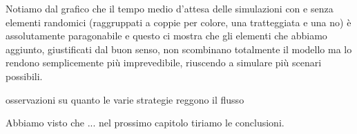
Notiamo dal grafico che il tempo medio d'attesa delle simulazioni con e senza elementi randomici (raggruppati a coppie per colore, una tratteggiata e una no) è assolutamente paragonabile e questo ci mostra che gli elementi che abbiamo aggiunto, giustificati dal buon senso, non scombinano totalmente il modello ma lo rendono semplicemente più imprevedibile, riuscendo a simulare più scenari possibili.


osservazioni su quanto le varie strategie reggono il flusso


\vspace*{1\baselineskip}



Abbiamo visto che ... nel prossimo capitolo tiriamo le conclusioni.
